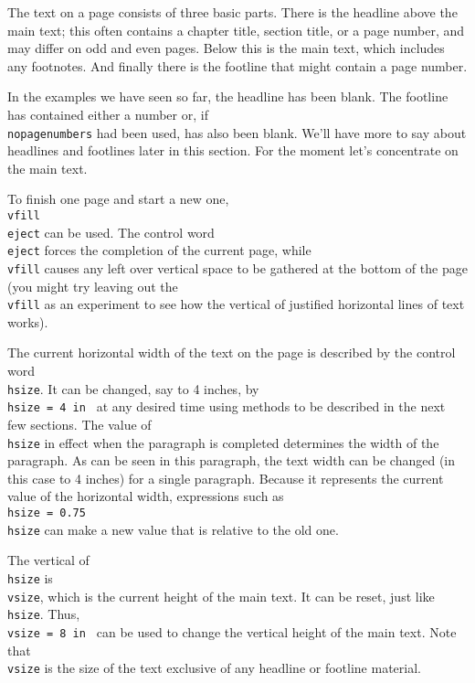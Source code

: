 The text on a page consists of three basic parts.  There is the 
headline above the main text; this often contains a chapter 
title, section title, or a page number, and may differ on odd and 
even pages. Below this is the main text, which includes any 
footnotes. And finally there is the footline that might contain a 
page number. 
 
In the examples we have seen so far, the headline has been blank. 
The footline has contained either a \centred{} number or, if {\tt 
\\nopagenumbers} had been used, has also been blank.  We'll have 
more to say about headlines and footlines later in this section. 
For the moment let's concentrate on the main text. 
 
To finish one page and start a new one, {\tt \\vfill \\eject} can 
be used.  The control word {\tt \\eject} forces the completion of 
the current page, while {\tt \\vfill} causes any left over 
vertical space to be gathered at the bottom of the page (you might 
try leaving out the {\tt \\vfill} as an experiment to see how the 
vertical \analog{} of justified horizontal lines of text works). 
 
 
{\hsize=4in 
The current horizontal width of the text on the page is described 
by the control word {\tt \\hsize}.  It can be changed, say to 4 
inches, by {\tt \\hsize = 4 in\ } at any desired time using 
methods to be described in the next few sections. The value of 
{\tt \\hsize} in effect when the paragraph is completed 
determines the width of the paragraph. As can be seen in this 
paragraph, the text width can be changed (in this case to 4 
inches) for a single paragraph.  Because it represents the 
current value of the horizontal width, expressions such as {\tt 
 \\hsize = 0.75\\hsize} can make a new value that is relative 
to the old one. \par} 
 
The vertical \analog{} of {\tt \\hsize} is {\tt \\vsize}, which 
is the current height of the main text.  It can be reset, just 
like {\tt \\hsize}.  Thus, {\tt \\vsize = 8 in\ } can be used to 
change the vertical height of the main text. Note that {\tt \\vsize} 
is the size of the text exclusive of any headline or 
footline material. 
 

